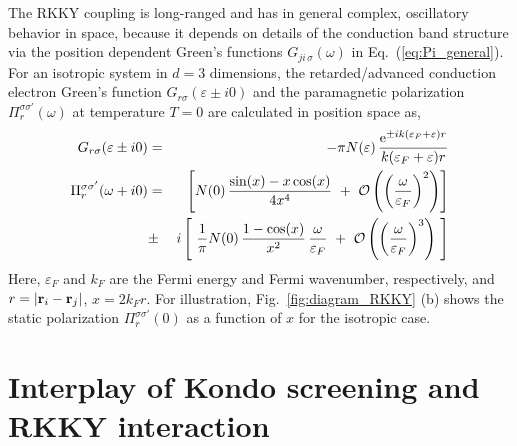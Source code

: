 \documentclass[12pt,twoside]{article}
\newcommand{\Eq}[1]{Eq.~(\ref{#1})}
\begin{document}
The RKKY coupling is long-ranged and has in general complex,
oscillatory behavior in space, because it depends on details of the 
conduction band structure via the position dependent 
Green's functions $G_{ji\,\sigma}(\omega)$ in \Eq{eq:Pi_general}.
For an isotropic system in $d=3$ dimensions, the retarded/advanced
conduction electron Green's function $G_{r\sigma}(\varepsilon\pm i0)$ 
and the paramagnetic polarization $\Pi_{r}^{\sigma\sigma'}(\omega)$ 
at temperature $T=0$ are calculated in position space as,
\begin{eqnarray}
G_{ r\sigma}(\varepsilon \pm i0) &=& - \pi N(\varepsilon)\,
\frac{{\rm e}^{\pm i k(\varepsilon_F+\varepsilon)r}}
{k(\varepsilon_F+\varepsilon)r} \\
\Pi_{r}^{\sigma\sigma'}(\omega+i0) &=& 
\ \ \left[  N(0)\,
\frac{\sin(x)-x\cos(x)}{4x^4}\ + 
\ {\cal O}\left(\left(\frac{\omega}{\varepsilon_F}\right)^2\right)
\right] \label{eq:chic_ret} \\
&\pm& i \left[\ \frac{1}{\pi} N(0)\, \frac{1-\cos(x)}{x^2}\, 
\frac{\omega}{\varepsilon_F}\ 
+ \ {\cal O}\left(\left(\frac{\omega}{\varepsilon_F}\right)^3\right)
\ \right]  \nonumber 
\end{eqnarray} 
Here, $\varepsilon_F$ and $k_F$ are the Fermi energy and Fermi wavenumber, 
respectively, and $r=|{\bf r}_i-{\bf r}_j|$, $x=2k_Fr$. 
For illustration, Fig.~\ref{fig:diagram_RKKY} (b) shows the static polarization
$\Pi_{r}^{\sigma\sigma'}(0)$ as a function of $x$ for the isotropic case.



\section{Interplay of Kondo screening and RKKY interaction}
\label{sec:Kondo-RKKY}
\end{document}
